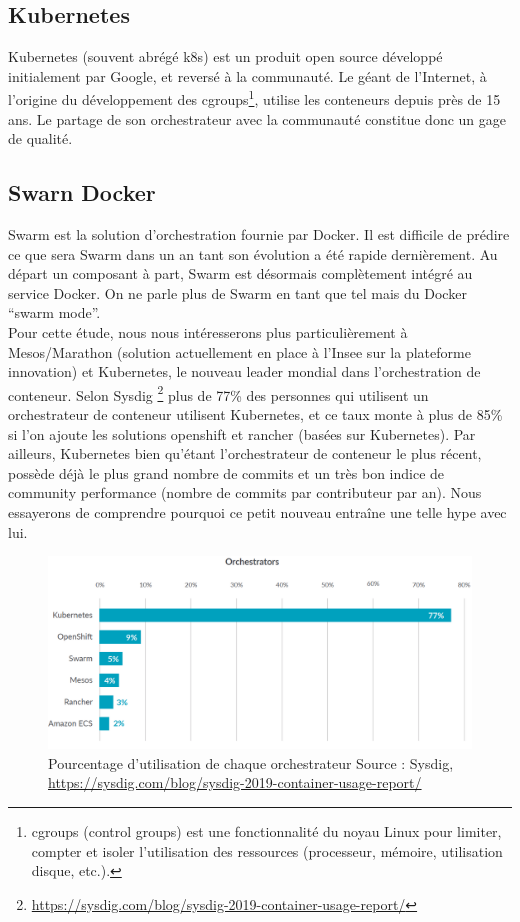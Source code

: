 \documentclass[11pt,fleqn]{book} %
\begin{document}
\subsection{Kubernetes}
Kubernetes (souvent abrégé k8s) est un produit open source développé initialement par Google, et reversé à la communauté. Le géant de l’Internet, à l’origine du développement des cgroups\footnote{cgroups (control groups) est une fonctionnalité du noyau Linux pour limiter, compter et isoler l'utilisation des ressources (processeur, mémoire, utilisation disque, etc.).}, utilise les conteneurs depuis près de 15 ans. Le partage de son orchestrateur avec la communauté constitue donc un gage de qualité. 

\subsection{Swarn Docker}
Swarm est la solution d’orchestration fournie par Docker. Il est difficile de prédire ce que sera Swarm dans un an tant son évolution a été rapide dernièrement. Au départ un composant à part, Swarm est désormais complètement intégré au service Docker. On ne parle plus de Swarm en tant que tel mais du Docker “swarm mode”.\\


Pour cette étude, nous nous intéresserons plus particulièrement à Mesos/Marathon (solution actuellement en place à l'Insee sur la plateforme innovation) et Kubernetes, le nouveau leader mondial dans l'orchestration de conteneur. Selon Sysdig \footnote{\url{https://sysdig.com/blog/sysdig-2019-container-usage-report/}} plus de 77\% des personnes qui utilisent un orchestrateur de conteneur utilisent Kubernetes, et ce taux monte à plus de 85\% si l'on ajoute les solutions openshift et rancher (basées sur Kubernetes). Par ailleurs, Kubernetes bien qu'étant l'orchestrateur de conteneur le plus récent, possède déjà le plus grand nombre de commits et un très bon indice de community performance (nombre de commits par contributeur par an). Nous essayerons de comprendre pourquoi ce petit nouveau entraîne une telle hype avec lui.
\begin{figure}[H]\centering
\renewcommand{\figurename}{Graphique}
\includegraphics[scale=0.3]{Pictures/orchestrators-2019.png}
\captionsetup{margin=1.5cm,format=hang,justification=justified}
\caption[]{Pourcentage d'utilisation de chaque orchestrateur\newline
Source : Sysdig, \url{https://sysdig.com/blog/sysdig-2019-container-usage-report/}}
\end{figure}
\end{document}
